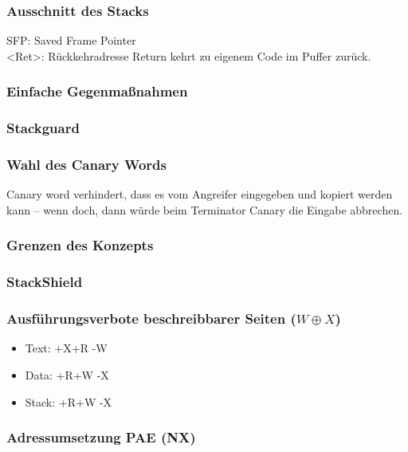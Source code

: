 \subsubsection{Ausschnitt des Stacks}
SFP: Saved Frame Pointer\\
<Ret>: Rückkehradresse
Return kehrt zu eigenem Code im Puffer zurück.

\subsubsection{Einfache Gegenmaßnahmen}

\subsubsection{Stackguard}
\subsubsection*{Wahl des Canary Words}
Canary word verhindert, dass es vom Angreifer eingegeben und kopiert werden kann -- wenn doch, dann würde beim Terminator Canary die Eingabe abbrechen.
\subsubsection*{Grenzen des Konzepts}

\subsubsection{StackShield}

\subsubsection[Ausführungsverbote beschreibbarer Seiten]{Ausführungsverbote beschreibbarer Seiten ($W \oplus X$)}
\begin{itemize}
\item Text: +X+R -W
\item Data: +R+W -X
\item Stack: +R+W -X
\end{itemize}
\subsubsection*{Adressumsetzung PAE (NX)}

